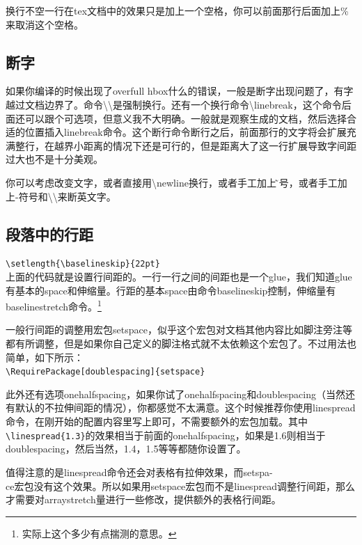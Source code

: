 \documentclass[12pt,oneside]{book}
\begin{document}
\begin{common-format}
换行不空一行在tex文档中的效果只是加上一个空格，你可以前面那行后面加上\%{}来取消这个空格。


\subsection{断字}
如果你编译的时候出现了overfull hbox什么的错误，一般是断字出现问题了，有字越过文档边界了。命令\textbackslash \textbackslash 是强制换行。还有一个换行命令\textbackslash linebreak，这个命令后面还可以跟个可选项，但意义我不大明确。一般就是观察生成的文档，然后选择合适的位置插入linebreak命令。这个断行命令断行之后，前面那行的文字将会扩展充满整行，在越界小距离的情况下还是可行的，但是距离大了这一行扩展导致字间距过大也不是十分美观。

你可以考虑改变文字，或者直接用\textbackslash newline换行，或者手工加上\~符号，或者手工加上-符号和\textbackslash \textbackslash 来断英文字。

\subsection[段落中的行距]{段落中的行距}
\verb+\setlength{\baselineskip}{22pt}+\\
上面的代码就是设置行间距的。一行一行之间的间距也是一个glue，我们知道glue有基本的space和伸缩量。行距的基本space由命令baselineskip控制，伸缩量有baselinestretch命令。\footnote{实际上这个多少有点揣测的意思。}

一般行间距的调整用宏包setspace，似乎这个宏包对文档其他内容比如脚注旁注等都有所调整，但是如果你自己定义的脚注格式就不太依赖这个宏包了。不过用法也简单，如下所示：\\
\verb+\RequirePackage[doublespacing]{setspace}+

此外还有选项onehalfspacing，如果你试了onehalfspacing和doublespacing（当然还有默认的不拉伸间距的情况），你都感觉不太满意。这个时候推荐你使用linespread命令，在刚开始的配置内容里写上即可，不需要额外的宏包加载。其中\verb+\linespread{1.3}+的效果相当于前面的onehalfspacing，如果是1.6则相当于doublespacing，然后当然，1.4，1.5等等都随你设置了。

\label{sec:段落中的行距}
值得注意的是linespread命令还会对表格有拉伸效果，而setspa-\\ce宏包没有这个效果。所以如果用setspace宏包而不是linespread调整行间距，那么才需要对arraystretch量进行一些修改，提供额外的表格行间距。



\end{common-format}
\end{document}
